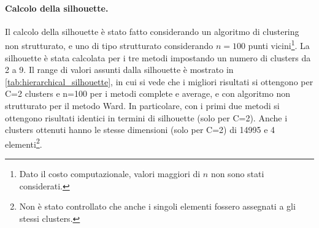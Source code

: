 \documentclass[a4paper]{article}
\begin{document}

\paragraph{Calcolo della silhouette.} Il calcolo della silhouette è stato fatto considerando un algoritmo di clustering non strutturato, e uno di tipo strutturato considerando $n=100$ punti vicini\footnote{Dato il costo computazionale, valori maggiori di $n$ non sono stati considerati.}. La silhouette è stata calcolata per i tre metodi impostando un numero di clusters da 2 a 9. Il range di valori assunti dalla silhouette è mostrato in \autoref{tab:hierarchical_silhouette}, in cui si vede che i migliori risultati si ottengono per C=2 clusters e n=100 per i metodi complete e average, e con algoritmo non strutturato per il metodo Ward. In particolare, con i primi due metodi si ottengono risultati identici in termini di silhouette (solo per C=2). Anche i clusters ottenuti hanno le stesse dimensioni (solo per C=2) di 14995 e 4 elementi\footnote{Non è stato controllato che anche i singoli elementi fossero assegnati a gli stessi clusters.}.  
\end{document}

